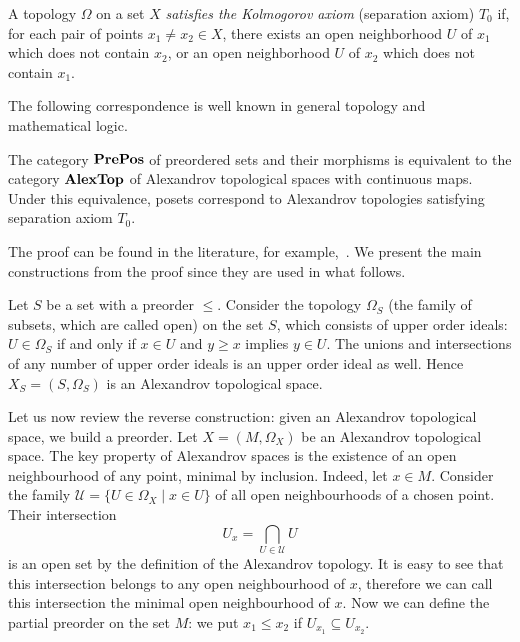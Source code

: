 \begin{defin}\label{defT0}
A topology $\Omega$ on a set $X$ \emph{satisfies the Kolmogorov axiom} (separation axiom) $T_0$ if, for each pair of points $x_1\neq x_2\in X$, there exists an open neighborhood $U$ of $x_1$ which does not contain $x_2$, or an open neighborhood $U$ of $x_2$ which does not contain $x_1$.
\end{defin}

The following correspondence is well known in general topology and mathematical logic.

\begin{prop}\label{propPosTop}
The category $\mathbf{PrePos}$ of preordered sets and their morphisms is equivalent to the category $\mathbf{AlexTop}$ of Alexandrov topological spaces with continuous maps. Under this equivalence, posets correspond to Alexandrov topologies satisfying separation axiom $T_0$.
\end{prop}

The proof can be found in the literature, for example,~\cite{Arenas}. We present the main constructions from the proof since they are used in what follows.

\begin{con}\label{conPrePosToSpace}
Let $S$ be a set with a preorder $\leq$. Consider the topology $\Omega_S$ (the family of subsets, which are called open) on the set $S$, which consists of upper order ideals: $U\in \Omega_S$ if and only if $x\in U$ and $y\geq x$ implies $y\in U$. The unions and intersections of any number of upper order ideals is an upper order ideal as well. Hence $X_S=(S,\Omega_S)$ is an Alexandrov topological space.
\end{con}

\begin{con}\label{conSpaceToPrepos}
Let us now review the reverse construction: given an Alexandrov topological space, we build a preorder. Let $X=(M,\Omega_X)$ be an Alexandrov topological space. The key property of Alexandrov spaces is the existence of an open neighbourhood of any point, minimal by inclusion. Indeed, let $x\in M$. Consider the family $\mathcal{U}=\{U\in \Omega_X\mid x\in U\}$ of all open neighbourhoods of a chosen point. Their intersection
\begin{equation}\label{eqDefUx}
U_x=\bigcap_{U\in \mathcal{U}}U
\end{equation}
is an open set by the definition of the Alexandrov topology. It is easy to see that this intersection belongs to any open neighbourhood of $x$, therefore we can call this intersection the minimal open neighbourhood of $x$. Now we can define the partial preorder on the set $M$: we put $x_1\leq x_2$ if $U_{x_1}\subseteq U_{x_2}$.
\end{con}

